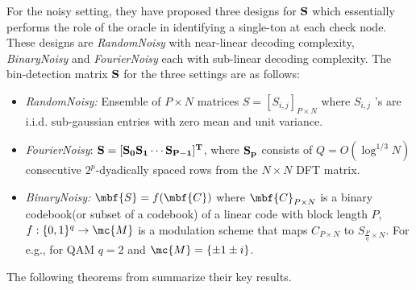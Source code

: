\documentclass[conference]{IEEEtran}
\begin{document}
For the noisy setting, they have proposed three designs for $\bf S$ which essentially performs the role of the oracle in identifying a single-ton at each check node. These designs are \emph{RandomNoisy} with near-linear decoding complexity, \emph{BinaryNoisy} and \emph{FourierNoisy} each with sub-linear decoding complexity.
The bin-detection matrix $\bf S$ for the three settings are as follows:
\begin{itemize}
\item \emph{RandomNoisy:}  Ensemble of $P \times N$ matrices $S = [S_{i,j}]_{P \times N}$ where $S_{i,j}$ $’$s are i.i.d. sub-gaussian entries with zero mean and unit variance.

\item  \emph{FourierNoisy}:  $\bf S = [S_0 S_1 \cdots S_{P-1}]^{T}$, where $\bf S_p$ consists of $Q=O(\log^{1/3}N)$ consecutive $2^p$-dyadically spaced rows from the $N \times N$ DFT matrix.

\item \emph{BinaryNoisy:}  $\mbf{S} = f(\mbf{C})$ where $\mbf{C}_{P \times N}$ is a binary codebook(or subset of a codebook) of a linear code with block length $P$, $f:\{0,1\}^q\rightarrow \mc{M}$ is a modulation scheme that maps $C_{P \times N}$ to $S_{\frac{P}{q}\times N}$. For e.g., for QAM $q=2$ and $\mc{M}=\{\pm 1 \pm i\}$.
\end{itemize}

The following theorems from \cite{li2015subdraft} summarize their key results.

\end{document}

